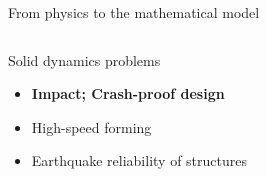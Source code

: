 \begin{frame}{From physics to the mathematical model}
  

  \vspace{-0.6cm}
  \begin{overprint}
    \begin{columns}
      \begin{column}{0.45\textwidth}
        \begin{block}{Solid dynamics problems}
          \begin{itemize}
          \item[] \textbf{Impact; Crash-proof design}
          \item[] High-speed forming
          \item[] Earthquake reliability of structures 
          \end{itemize}
        \end{block}
      \end{column}
      
      \begin{column}{0.55\textwidth}
      \end{column}
    \end{columns}
    

\end{overprint}
\end{frame}
